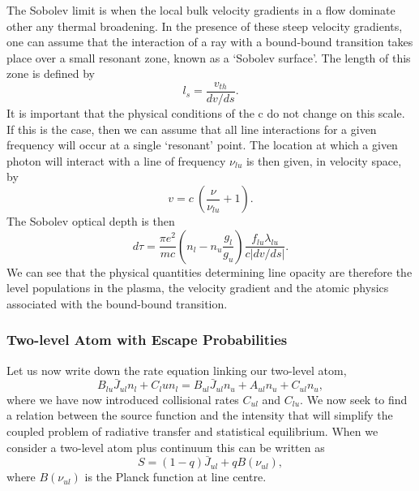 The Sobolev limit is when the local bulk velocity gradients in a flow 
dominate other any thermal broadening. In the presence of these steep
velocity gradients, one can assume that the interaction of a ray with a bound-bound
transition takes place over a small resonant zone, known as a 
`Sobolev surface'. The length of this zone is defined by
\begin{equation}
l_s = \frac{v_{th}}{dv / ds}.
\end{equation}
It is important that the physical conditions of the c do not change on this scale.
If this is the case, then we can assume that all line interactions for a given 
frequency will occur at a single `resonant' point. The location at which
a given photon will interact with a line of frequency $\nu_{lu}$
is then given, in velocity space, by
\begin{equation}
v = c~\left(\frac{\nu}{\nu_{lu}} + 1\right).
\label{eq:resonance}
\end{equation}
The Sobolev optical depth is then
\begin{equation}
d \tau = \frac{\pi e^2}{m c}  \left(n_l - n_u \frac{g_l}{g_u} \right) \frac{f_{lu} \lambda_{lu}}{c | dv / ds |}.
\label{eq:tau_sob}
\end{equation}
We can see that the physical quantities determining line opacity are therefore 
the level populations in the plasma, the velocity gradient and the atomic physics
associated with the bound-bound transition.

\subsubsection{Two-level Atom with Escape Probabilities}

Let us now write down the rate equation linking our two-level atom,
\begin{equation}
B_{lu} \bar{J}_{ul} n_l + C_lu n_l = 
B_{ul} \bar{J}_{ul} n_u + A_{ul} n_u + C_{ul} n_u,
\label{eq:rate_2level}
\end{equation}
where we have now introduced collisional rates $C_{ul}$ and $C_{lu}$.
We now seek to find a relation between the source function
and the intensity that will simplify the coupled problem of radiative transfer
and statistical equilibrium. When we consider a two-level atom
plus continuum this can be written  as \citep{mihalas}
\begin{equation}
S = (1 - q) \bar{J}_{ul} + q B(\nu_{ul}),
\label{eq:rate_2level}
\end{equation}
where $B(\nu_{ul})$ is the Planck function at line centre.



